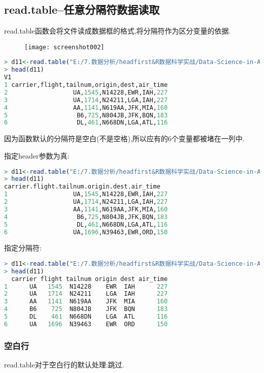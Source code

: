 \documentclass[11pt,a4paper,oneside]{book}
\begin{document}
\subsection{read.table--任意分隔符数据读取}
read.table函数会将文件读成数据框的格式,将分隔符作为区分变量的依据.
\begin{figure}[H]
	\centering
	\texttt{[image: screenshot002]}
\end{figure}
\begin{lstlisting}[language=r]
> d11<-read.table("E:/7.数据分析/headfirst&R数据科学实战/Data-Science-in-Action-R-Tools-and-Case-Studies-master/chapter1/RawData/flights.csv")
> head(d11)
V1
1 carrier,flight,tailnum,origin,dest,air_time
2                  UA,1545,N14228,EWR,IAH,227
3                  UA,1714,N24211,LGA,IAH,227
4                  AA,1141,N619AA,JFK,MIA,160
5                   B6,725,N804JB,JFK,BQN,183
6                   DL,461,N668DN,LGA,ATL,116
\end{lstlisting}
因为函数默认的分隔符是空白(不是空格),所以应有的6个变量都被堵在一列中.

指定header参数为真:
\begin{lstlisting}[language=r]
> d11<-read.table("E:/7.数据分析/headfirst&R数据科学实战/Data-Science-in-Action-R-Tools-and-Case-Studies-master/chapter1/RawData/flights.csv",header=T)
> head(d11)
carrier.flight.tailnum.origin.dest.air_time
1                  UA,1545,N14228,EWR,IAH,227
2                  UA,1714,N24211,LGA,IAH,227
3                  AA,1141,N619AA,JFK,MIA,160
4                   B6,725,N804JB,JFK,BQN,183
5                   DL,461,N668DN,LGA,ATL,116
6                  UA,1696,N39463,EWR,ORD,150
\end{lstlisting}

指定分隔符:
\begin{lstlisting}[language=r]
> d11<-read.table("E:/7.数据分析/headfirst&R数据科学实战/Data-Science-in-Action-R-Tools-and-Case-Studies-master/chapter1/RawData/flights.csv",header=T,sep=",")
> head(d11)
  carrier flight tailnum origin dest air_time
1      UA   1545  N14228    EWR  IAH      227
2      UA   1714  N24211    LGA  IAH      227
3      AA   1141  N619AA    JFK  MIA      160
4      B6    725  N804JB    JFK  BQN      183
5      DL    461  N668DN    LGA  ATL      116
6      UA   1696  N39463    EWR  ORD      150
\end{lstlisting}

\subsubsection{空白行}
read.table对于空白行的默认处理:跳过.
\end{document}
